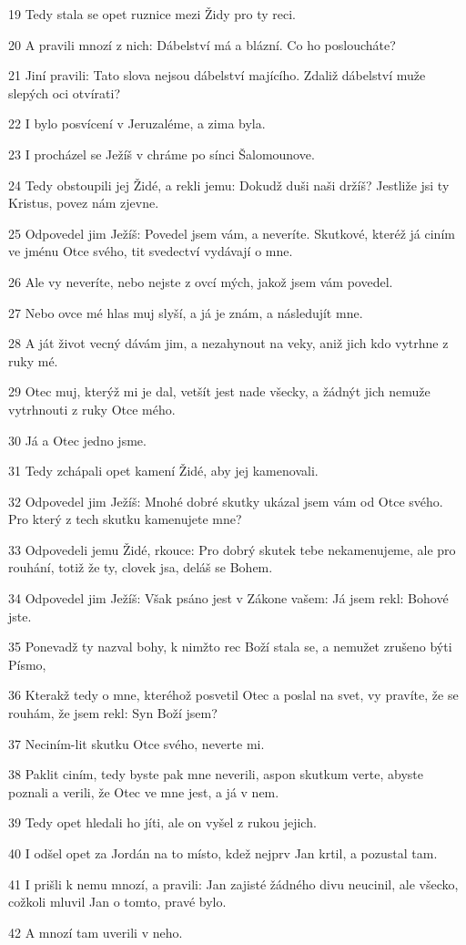\par 19 Tedy stala se opet ruznice mezi Židy pro ty reci.
\par 20 A pravili mnozí z nich: Dábelství má a blázní. Co ho posloucháte?
\par 21 Jiní pravili: Tato slova nejsou dábelství majícího. Zdaliž dábelství muže slepých oci otvírati?
\par 22 I bylo posvícení v Jeruzaléme, a zima byla.
\par 23 I procházel se Ježíš v chráme po sínci Šalomounove.
\par 24 Tedy obstoupili jej Židé, a rekli jemu: Dokudž duši naši držíš? Jestliže jsi ty Kristus, povez nám zjevne.
\par 25 Odpovedel jim Ježíš: Povedel jsem vám, a neveríte. Skutkové, kteréž já ciním ve jménu Otce svého, tit svedectví vydávají o mne.
\par 26 Ale vy neveríte, nebo nejste z ovcí mých, jakož jsem vám povedel.
\par 27 Nebo ovce mé hlas muj slyší, a já je znám, a následujít mne.
\par 28 A ját život vecný dávám jim, a nezahynout na veky, aniž jich kdo vytrhne z ruky mé.
\par 29 Otec muj, kterýž mi je dal, vetšít jest nade všecky, a žádnýt jich nemuže vytrhnouti z ruky Otce mého.
\par 30 Já a Otec jedno jsme.
\par 31 Tedy zchápali opet kamení Židé, aby jej kamenovali.
\par 32 Odpovedel jim Ježíš: Mnohé dobré skutky ukázal jsem vám od Otce svého. Pro který z tech skutku kamenujete mne?
\par 33 Odpovedeli jemu Židé, rkouce: Pro dobrý skutek tebe nekamenujeme, ale pro rouhání, totiž že ty, clovek jsa, deláš se Bohem.
\par 34 Odpovedel jim Ježíš: Však psáno jest v Zákone vašem: Já jsem rekl: Bohové jste.
\par 35 Ponevadž ty nazval bohy, k nimžto rec Boží stala se, a nemužet zrušeno býti Písmo,
\par 36 Kterakž tedy o mne, kteréhož posvetil Otec a poslal na svet, vy pravíte, že se rouhám, že jsem rekl: Syn Boží jsem?
\par 37 Neciním-lit skutku Otce svého, neverte mi.
\par 38 Paklit ciním, tedy byste pak mne neverili, aspon skutkum verte, abyste poznali a verili, že Otec ve mne jest, a já v nem.
\par 39 Tedy opet hledali ho jíti, ale on vyšel z rukou jejich.
\par 40 I odšel opet za Jordán na to místo, kdež nejprv Jan krtil, a pozustal tam.
\par 41 I prišli k nemu mnozí, a pravili: Jan zajisté žádného divu neucinil, ale všecko, cožkoli mluvil Jan o tomto, pravé bylo.
\par 42 A mnozí tam uverili v neho.

